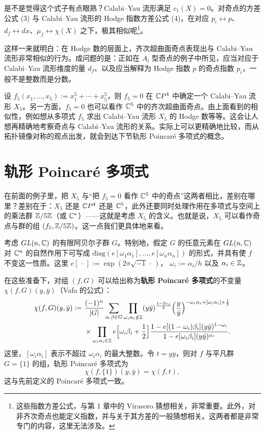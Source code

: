 是不是觉得这个式子有点眼熟？Calabi--Yau 流形满足 $c_1(X)=0$。对奇点的方差公式 (3) 与 Calabi--Yau 流形的 Hodge 指数方差公式 (4)，在对应 $p_i\leftrightarrow p$、$d_f\leftrightarrow dx$、$\mu_f\leftrightarrow\chi(X)$ 之下，极其相似呢\footnote{这些指数方差公式，与第 1 章中的 Virasoro 猜想相关，非常重要。此外，对非齐次奇点也能定义指数，并与关于其方差的一般猜想相关。这两者都是非常专门的内容，这里无法涉及。}。

这样一来就明白：在 Hodge 数的层面上，齐次超曲面奇点表现出与 Calabi--Yau 流形非常相似的行为。成问题的是：正如在 $A_l$ 型奇点的例子中所见，应当对应于 Calabi--Yau 流形维度的量 $d_f$、以及应当解释为 Hodge 指数 $p$ 的奇点指数 $p_i$，一般不是整数而是分数。

设 $f_5(x_1,\dots,x_5):=x_1^5+\cdots+x_5^5$，则 $f_5=0$ 在 $\mathbb{C}P^4$ 中确定一个 Calabi--Yau 流形 $X_5$。另一方面，$f_5=0$ 也可以看作 $\mathbb{C}^5$ 中的齐次超曲面奇点。由上面看到的相似性，例如想从多项式 $f_5$ 求出 Calabi--Yau 流形 $X_5$ 的 Hodge 数等等。这会让人想再精确地考察奇点与 Calabi--Yau 流形的关系。实际上可以更精确地比较，而从拓扑镜像对称的观点出发，就会到达下节轨形 Poincaré 多项式的概念。

\section{轨形 Poincaré 多项式}

在前面的例子里，把 $X_5$ 与“把 $f_5=0$ 看作 $\mathbb{C}^5$ 中的奇点”这两者相比，差别在哪里？差别在于：$X_5$ 还是
$\mathbb{C}P^4$ 还是 $\mathbb{C}^5$，此外还要同时处理作用在多项式与空间上的乘法群 $\mathbb{Z}/5\mathbb{Z}$（或 $\mathbb{C}^*$）——这就是考虑 $X_5$ 的含义。也就是说，$X_5$ 可以看作奇点与群的组 $(f_5,\mathbb{Z}/5\mathbb{Z})$。这一点我们更具体地来看。

考虑 $GL(n,\mathbb{C})$ 的有限阿贝尔子群 $G$。特别地，假定 $G$ 的任意元素在 $GL(n,\mathbb{C})$ 对 $\mathbb{C}^n$ 的自然作用下可写成 $\mathrm{diag}(e[\omega_1\alpha_1],\dots,e[\omega_n\alpha_n])$ 的形式，并具有使 $f$ 不变这一性质。这里 $e[\,\cdot\,]:=\exp(2\pi\sqrt{-1}\,\cdot\,)$，%
$\omega_i:=\alpha_i/h$ 以及 $\alpha_i\in\mathbb{Z}$。

在这些准备下，对组 $(f,G)$ 可以给出称为\textbf{轨形 Poincaré 多项式}的不变量 $\chi(f,G)(y,\bar y)$（Vafa 的公式）：
%
\[
\begin{aligned}
  \chi(f,G)(y,\bar y):={}&\frac{(-1)^n}{|G|}\sum_{\alpha,\beta\in G}
  \prod_{\omega_i\alpha_i\notin\mathbb{Z}}(y\bar y)^{\frac{1-2\omega_i}{2}}
  \Big(\frac{y}{\bar y}\Big)^{-\omega_i\alpha_i+[\omega_i\alpha_i]+\frac{1}{2}}\\
  &\times\prod_{\omega_i\alpha_i\in\mathbb{Z}}e\Big[\omega_i\beta_i+\frac{1}{2}\Big]
  \frac{1-e[(1-\omega_i)\beta_i](y\bar y)^{1-\omega_i}}
       {1-e[\omega_i\beta_i](y\bar y)^{\omega_i}}.
\end{aligned}
\]
%
这里，$[\omega_i\alpha_i]$ 表示不超过 $\omega_i\alpha_i$ 的最大整数。令 $t=y\bar y$，则对 $f$ 与平凡群 $G=\{1\}$ 的组，轨形 Poincaré 多项式为
%
\[
  \chi(f,\{1\})(y,\bar y)=\chi(f,t),
\]
%
这与先前定义的 Poincaré 多项式一致。

